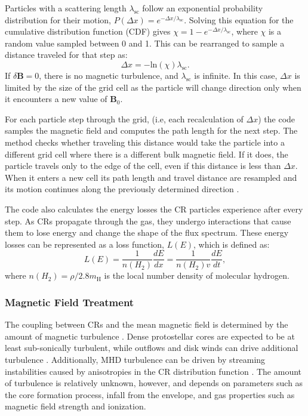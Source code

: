 \documentclass[twocolumn]{aastex63}
\def\t{\text}
\begin{document}
Particles with a scattering length $\lambda_{\t{sc}}$ follow an exponential probability distribution for their motion, $P(\Delta x)=e^{-\Delta x/\lambda_{\t{sc}}}$. Solving this equation for the cumulative distribution function (CDF) gives $\chi = 1-e^{-\Delta x/\lambda_{\t{sc}}}$, where $\chi$ is a random value sampled between 0 and 1. This can be rearranged to sample a distance traveled for that step as:
\begin{equation} \label{eq:transdis} 
\Delta x= -\text{ln}(\chi)\lambda_{\t{sc}}.
\end{equation}
If $\delta \textbf{B}=0$, there is no magnetic turbulence, and $\lambda_{\t{sc}}$ is infinite. In this case, $\Delta x$ is limited by the size of the grid cell as the particle will change direction only when it encounters a new value of $\textbf{B}_0$. 

For each particle step through the grid, (i.e, each recalculation of $\Delta x$) the code samples the magnetic field and computes the path length for the next step. The method checks whether traveling this distance would take the particle into a different grid cell where there is a different bulk magnetic field. If it does, the particle travels only to the edge of the cell, even if this distance is less than $\Delta x$. When it enters a new cell its path length and travel distance are resampled and its motion continues along the previously determined direction \citep{harding_2016_CRs, fitzaxen_2021_CRs}.

The code also calculates the energy losses the CR particles experience after every step. As CRs propagate through the gas, they undergo interactions that cause them to lose energy and change the shape of the flux spectrum. These energy losses can be represented as a loss function, $L(E)$, which is defined as: 
\begin{equation}
    \label{eq:loss}
    L(E)=\frac{1}{n(H_2)}\frac{dE}{dx}=\frac{1}{n(H_2) v}\frac{dE}{dt},
\end{equation}
where $n(H_2)=\rho/2.8m_{\t{H}}$ is the local number density of molecular hydrogen.

\subsubsection{Magnetic Field Treatment}
\label{subsubsection:bfield}

The coupling between CRs and the mean magnetic field is determined by the amount of magnetic turbulence \citep{rodgers-lee_2017_CRs, thomas_2019_hydrodynamics, bai_2019_magnetohydrodynamic}. Dense protostellar cores are expected to be at least sub-sonically turbulent, while outflows and disk winds can drive additional turbulence \citep{bai_2016_disks, offner_2017_impact}. Additionally, MHD turbulence can be driven by streaming instabilities caused by anisotropies in the CR distribution function \citep{morlino_2015_instability, padovani_2020_review}. The amount of turbulence is relatively unknown, however, and depends on parameters such as the core formation process, infall from the envelope, and gas properties such as magnetic field strength and ionization.
\end{document}
